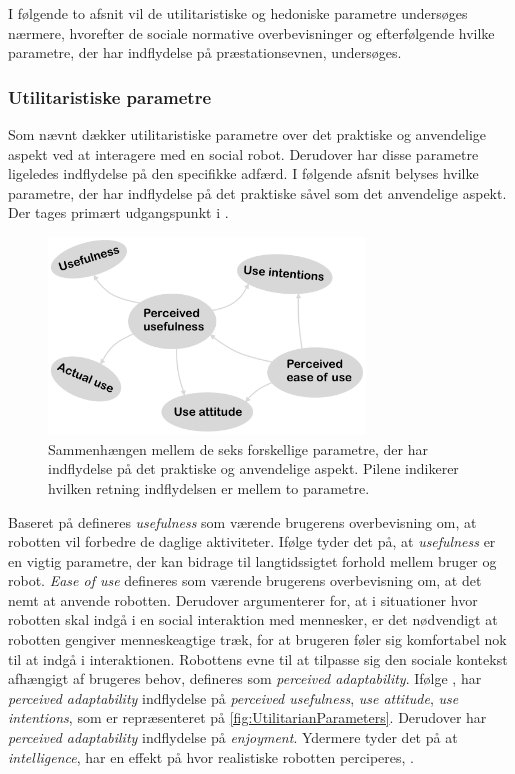 I følgende to afsnit vil de utilitaristiske og hedoniske parametre undersøges nærmere, hvorefter de sociale normative overbevisninger og efterfølgende hvilke parametre, der har indflydelse på præstationsevnen, undersøges.
%   

\subsubsection*{Utilitaristiske parametre}
\label{InteraktionSocialeRobotterParametreUtilitarian}
%
Som nævnt dækker utilitaristiske parametre over det praktiske og anvendelige aspekt ved at interagere med en social robot. Derudover har disse parametre ligeledes indflydelse på den specifikke adfærd. I følgende afsnit belyses hvilke parametre, der har indflydelse på det praktiske såvel som det anvendelige aspekt. Der tages primært udgangspunkt i \textcite[s. 1477]{PDF:SharingALifeHarvey}.
%
\begin{figure}[H]
\centering
\includegraphics[width = 0.75\textwidth]{Figure/UtilitarianParameters} 
\caption{Sammenhængen mellem de seks forskellige parametre, der har indflydelse på det praktiske og anvendelige aspekt. Pilene indikerer hvilken retning indflydelsen er mellem to parametre.}
\label{fig:UtilitarianParameters}
\end{figure}
\noindent 
%
Baseret på \textcite[s. 1477]{PDF:SharingALifeHarvey} defineres \textit{usefulness} som værende brugerens overbevisning om, at robotten vil forbedre de daglige aktiviteter. Ifølge \textcite[s. 11]{PDF:SharingALifeHarvey} tyder det på, at \textit{usefulness} er en vigtig parametre, der kan bidrage til langtidssigtet forhold mellem bruger og robot. \textit{Ease of use} defineres som værende brugerens overbevisning om, at det nemt at anvende robotten. Derudover argumenterer \textcite[s. 1477]{PDF:SharingALifeHarvey} for, at i situationer hvor robotten skal indgå i en social interaktion med mennesker, er det nødvendigt at robotten gengiver menneskeagtige træk, for at brugeren føler sig komfortabel nok til at indgå i interaktionen. Robottens evne til at tilpasse sig den sociale kontekst afhængigt af brugeres behov, defineres som \textit{perceived adaptability}. Ifølge \textcite[s. 1477]{PDF:SharingALifeHarvey}, har \textit{perceived adaptability} indflydelse på \textit{perceived usefulness}, \textit{use attitude}, \textit{use intentions}, som er repræsenteret på \autoref{fig:UtilitarianParameters}. Derudover har \textit{perceived adaptability} indflydelse på \textit{enjoyment}. Ydermere tyder det på at \textit{intelligence}, har en effekt på hvor realistiske robotten perciperes, \parencite[s. 1477]{PDF:ExploringInfluencingVariable}.   
%
